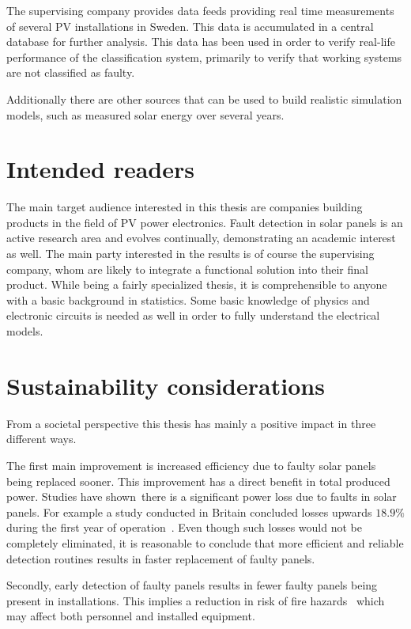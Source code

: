 The supervising company provides data feeds providing real time measurements of several PV installations in Sweden.
This data is accumulated in a central database for further analysis.
This data has been used in order to verify real-life performance of the classification system, primarily to verify that working systems are not classified as faulty.

Additionally there are other sources that can be used to build realistic simulation models, such as measured solar energy over several years.

\section{Intended readers}
The main target audience interested in this thesis are companies building products in the field of PV power electronics.
Fault detection in solar panels is an active research area and evolves continually, demonstrating an academic interest as well.
The main party interested in the results is of course the supervising company, whom are likely to
integrate a functional solution into their final product.
While being a fairly specialized thesis, it is comprehensible to anyone with a basic background in statistics.
Some basic knowledge of physics and electronic circuits is needed as well in order to fully understand the electrical models.

\section{Sustainability considerations}
From a societal perspective this thesis has mainly a positive impact in three different ways.

The first main improvement is increased efficiency due to faulty solar panels being replaced sooner.
This improvement has a direct benefit in total produced power.
Studies have shown there is a significant power loss due to faults in solar panels.
For example a study conducted in Britain concluded losses upwards $18.9\%$ during the first year of operation~\cite{Firth2010}.
Even though such losses would not be completely eliminated, it is reasonable to conclude that more efficient and reliable detection routines results in faster replacement of faulty panels.

Secondly, early detection of faulty panels results in fewer faulty panels being present in installations.
This implies a reduction in risk of fire hazards~\cite{Zhao2010night} which may affect both personnel and installed equipment.

